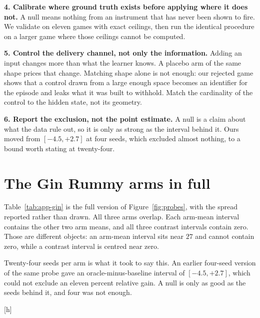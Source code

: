 \documentclass{article}
\makeatletter
\renewenvironment{table}
{\setlength{\abovecaptionskip}{10\p@}%
   \setlength{\belowcaptionskip}{\z@}%
\@float{table}} {\end@float}
\makeatother
\begin{document}
\textbf{4. Calibrate where ground truth exists before applying where it does not.} A null means nothing from an instrument that has never been shown to fire. We validate on eleven games with exact ceilings, then run the identical procedure on a larger game where those ceilings cannot be computed.

\textbf{5. Control the delivery channel, not only the information.} Adding an input changes more than what the learner knows. A placebo arm of the same shape prices that change. Matching shape alone is not enough: our rejected game shows that a control drawn from a large enough space becomes an identifier for the episode and leaks what it was built to withhold. Match the cardinality of the control to the hidden state, not its geometry.

\textbf{6. Report the exclusion, not the point estimate.} A null is a claim about what the data rule out, so it is only as strong as the interval behind it. Ours moved from $[-4.5, +2.7]$ at four seeds, which excluded almost nothing, to a bound worth stating at twenty-four.

\section{The Gin Rummy arms in full}
\label{app:gin}

Table~\ref{tab:app-gin} is the full version of Figure~\ref{fig:probes}, with the spread reported rather than drawn. All three arms overlap. Each arm-mean interval contains the other two arm means, and all three contrast intervals contain zero. Those are different objects: an arm-mean interval sits near $27$ and cannot contain zero, while a contrast interval is centred near zero.

Twenty-four seeds per arm is what it took to say this. An earlier four-seed version of the same probe gave an oracle-minus-baseline interval of $[-4.5, +2.7]$, which could not exclude an eleven percent relative gain. A null is only as good as the seeds behind it, and four was not enough.

\begin{table}[h]
  \centering \small
  
  \caption{The three Gin Rummy arms at twenty-four seeds each, as win rate against the reference. Arm intervals are 95 percent from $t$ on twenty-three degrees of freedom. Contrast intervals use independent-arm standard errors with Welch degrees of freedom, about 41 here.}
  \label{tab:app-gin}
\end{table}
\end{document}
